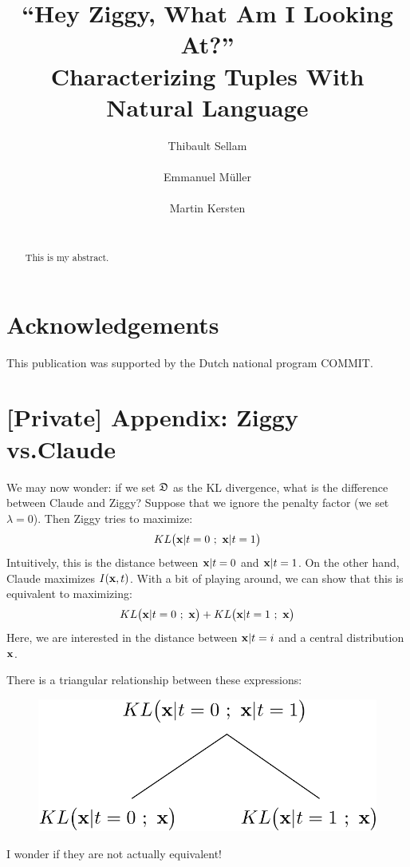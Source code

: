 \documentclass{sig-alternate-2013}
\newcommand{\mf}{\ensuremath{\mathfrak}}
\newcommand{\rb}{\ensuremath{\mathbf}}
\begin{document}
\title{``Hey Ziggy, What Am I Looking At?''\\
Characterizing Tuples With Natural Language}

\author{
\alignauthor
Thibault Sellam\\
       \\
\alignauthor
Emmanuel M\"uller\\
    \\
\alignauthor
Martin Kersten\\
       \\
}

\maketitle

\begin{abstract}
    This is my abstract.
\end{abstract}





\section{Acknowledgements}
This publication was supported by the Dutch national program COMMIT.




\section*{[Private] Appendix: Ziggy vs.Claude}
\label{zigvsclaude}
We may now wonder: if we set $\mf{D}$ as the KL divergence, what is the
difference between Claude and Ziggy?  Suppose that we ignore the penalty factor
(we set $\lambda=0$). Then Ziggy tries to maximize:
$$
KL\big(\rb{x} | t=0 \ ; \  \rb{x} | t=1 \big)
$$
Intuitively, this is the distance between $\rb{x} | t=0$ and $\rb{x} | t=1$.
On the other hand, Claude maximizes $I(\rb{x}, t)$. With a bit of playing
around, we can show that this is equivalent to maximizing:
$$
    KL\big(\rb{x} | t=0 \ ; \  \rb{x} \big) + 
        KL\big(\rb{x} | t=1 \ ; \  \rb{x} \big)
$$
Here, we are interested in the distance between $\rb{x} | t=i$ and a central
distribution $\rb{x}$. 

There is a triangular relationship between these expressions:
\begin{figure}[h!]
  \centering
  \includegraphics[width=0.6\columnwidth]{Figures/Triangle}
  \label{pic:triangle}
\end{figure}

I wonder if they are not actually equivalent!
\end{document}

